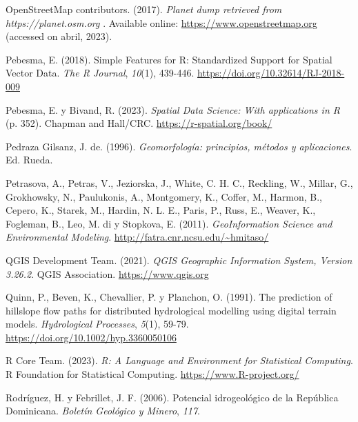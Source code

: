 \documentclass[spanish]{article}
\newlength{\cslhangindent}
\newlength{\cslentryspacingunit} %
\newenvironment{CSLReferences}[2] %
 {%
  \setlength{\parindent}{0pt}
  \ifodd #1
  \let\oldpar\par
  \def\par{\hangindent=\cslhangindent\oldpar}
  \fi
  \setlength{\parskip}{#2\cslentryspacingunit}
 }%
 {}
\begin{document}
\begin{CSLReferences}{1}{0}
\leavevmode{}%
OpenStreetMap contributors. (2017). \emph{{Planet dump retrieved from
https://planet.osm.org }}. Available online:
\url{https://www.openstreetmap.org} (accessed on abril, 2023).

\leavevmode{}%
Pebesma, E. (2018). {Simple Features for R: Standardized Support for
Spatial Vector Data}. \emph{{The R Journal}}, \emph{10}(1), 439-446.
\url{https://doi.org/10.32614/RJ-2018-009}

\leavevmode{}%
Pebesma, E. y Bivand, R. (2023). \emph{{Spatial Data Science: With
applications in R}} (p. 352). {Chapman and Hall/CRC}.
\url{https://r-spatial.org/book/}

\leavevmode{}%
Pedraza Gilsanz, J. de. (1996). \emph{Geomorfología: principios, métodos
y aplicaciones}. Ed. Rueda.

\leavevmode{}%
Petrasova, A., Petras, V., Jeziorska, J., White, C. H. C., Reckling, W.,
Millar, G., Grokhowsky, N., Paulukonis, A., Montgomery, K., Coffer, M.,
Harmon, B., Cepero, K., Starek, M., Hardin, N. L. E., Paris, P., Russ,
E., Weaver, K., Fogleman, B., Leo, M. di y Stopkova, E. (2011).
\emph{GeoInformation Science and Environmental Modeling}.
\url{http://fatra.cnr.ncsu.edu/~hmitaso/}

\leavevmode{}%
QGIS Development Team. (2021). \emph{QGIS Geographic Information System,
Version 3.26.2}. QGIS Association. \url{https://www.qgis.org}

\leavevmode{}%
Quinn, P., Beven, K., Chevallier, P. y Planchon, O. (1991). The
prediction of hillslope flow paths for distributed hydrological
modelling using digital terrain models. \emph{Hydrological Processes},
\emph{5}(1), 59-79. \url{https://doi.org/10.1002/hyp.3360050106}

\leavevmode{}%
R Core Team. (2023). \emph{R: A Language and Environment for Statistical
Computing}. R Foundation for Statistical Computing.
\url{https://www.R-project.org/}

\leavevmode{}%
Rodríguez, H. y Febrillet, J. F. (2006). {Potencial idrogeológico de la
República Dominicana}. \emph{Boletín Geológico y Minero}, \emph{117}.


\end{CSLReferences}
\end{document}
